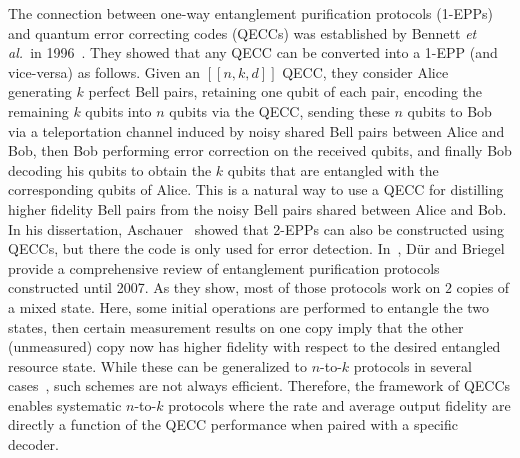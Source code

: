 \documentclass[journal,onecolumn]{IEEEtran}
\newcommand{\etal}{\emph{et al.~}}
\newcommand{\llbr}{[\![}
\newcommand{\rrbr}{]\!]}
\begin{document}
The connection between one-way entanglement purification protocols (1-EPPs) and quantum error correcting codes (QECCs) was established by Bennett \etal in 1996~\cite{Bennett-pra96}.
They showed that any QECC can be converted into a 1-EPP (and vice-versa) as follows.
Given an $\llbr n,k,d \rrbr$ QECC, they consider Alice generating $k$ perfect Bell pairs, retaining one qubit of each pair, encoding the remaining $k$ qubits into $n$ qubits via the QECC, sending these $n$ qubits to Bob via a teleportation channel induced by noisy shared Bell pairs between Alice and Bob, then Bob performing error correction on the received qubits, and finally Bob decoding his qubits to obtain the $k$ qubits that are entangled with the corresponding qubits of Alice.
This is a natural way to use a QECC for distilling higher fidelity Bell pairs from the noisy Bell pairs shared between Alice and Bob.
In his dissertation, Aschauer~\cite{Aschauer-phd05} showed that 2-EPPs can also be constructed using QECCs, but there the code is only used for error detection.
In~\cite{Dur-rpp07}, D{\"u}r and Briegel provide a comprehensive review of entanglement purification protocols constructed until 2007.
As they show, most of those protocols work on $2$ copies of a mixed state. 
Here, some initial operations are performed to entangle the two states, then certain measurement results on one copy imply that the other (unmeasured) copy now has higher fidelity with respect to the desired entangled resource state.
While these can be generalized to $n$-to-$k$ protocols in several cases~\cite{Dur-rpp07}, such schemes are not always efficient.
Therefore, the framework of QECCs enables systematic $n$-to-$k$ protocols where the rate and average output fidelity are directly a function of the QECC performance when paired with a specific decoder.
\end{document}
